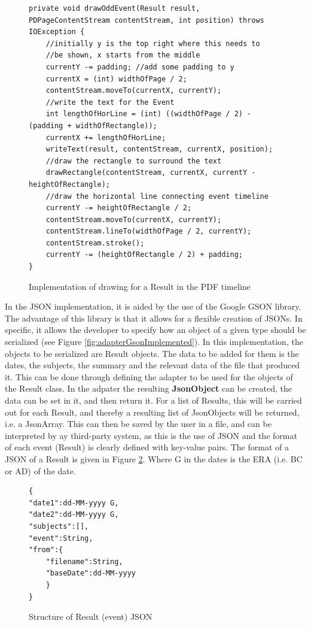 \begin{figure}[H]
\begin{lstlisting}
private void drawOddEvent(Result result, PDPageContentStream contentStream, int position) throws IOException {
	//initially y is the top right where this needs to 
	//be shown, x starts from the middle
	currentY -= padding; //add some padding to y
	currentX = (int) widthOfPage / 2;
	contentStream.moveTo(currentX, currentY);
	//write the text for the Event
	int lengthOfHorLine = (int) ((widthOfPage / 2) - (padding + widthOfRectangle));
	currentX += lengthOfHorLine;
	writeText(result, contentStream, currentX, position);
	//draw the rectangle to surround the text
	drawRectangle(contentStream, currentX, currentY - heightOfRectangle);
	//draw the horizontal line connecting event timeline
	currentY -= heightOfRectangle / 2;
	contentStream.moveTo(currentX, currentY);
	contentStream.lineTo(widthOfPage / 2, currentY);
	contentStream.stroke();
	currentY -= (heightOfRectangle / 2) + padding;
}
\end{lstlisting}
\caption{Implementation of drawing for a Result in the PDF timeline}
\label{fig:drawRecImplemented}
\end{figure}
\par In the JSON implementation, it is aided by the use of the Google GSON library. The advantage of this library is that it allows for a flexible creation of JSONs. In specific, it allows the developer to specify how an object of a given type should  be serialized (see Figure \ref{fig:adapterGsonImplemented}). In this implementation, the objects to be serialized are Result objects. The data to be added for them is the dates, the subjects, the summary and the relevant data of the file that produced it. This can be done through defining the adapter to be used for the objects of the Result class. In the adpater the resulting \textbf{JsonObject} can be created, the data can be set in it, and then return it. For a list of Results, this will be carried out for each Result, and thereby a resulting list of JsonObjects will be returned, i.e. a JsonArray. This can then be saved by the user in a file, and can be interpreted by ay third-party system, as this is the use of JSON and the format of each event (Result) is clearly defined with key-value pairs. The format of a JSON of a Result is given in Figure \ref{fig:jsonResult}. Where G in the dates is the ERA (i.e. BC or AD) of the date.
\begin{figure}[h]
\begin{lstlisting}
{
"date1":dd-MM-yyyy G,
"date2":dd-MM-yyyy G,
"subjects":[],
"event":String,
"from":{
	"filename":String,
	"baseDate":dd-MM-yyyy
	}
}
\end{lstlisting}
\caption{Structure of Result (event) JSON}
\label{fig:jsonResult}
\end{figure}
